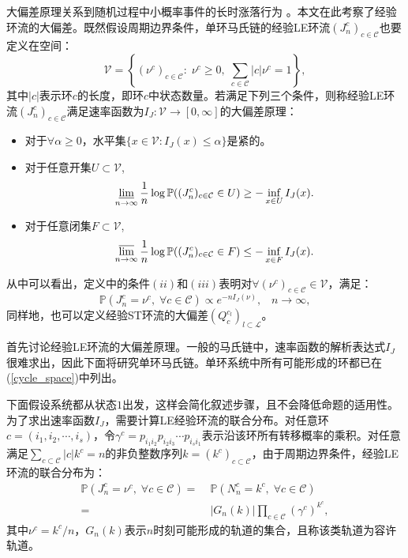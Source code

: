 大偏差原理关系到随机过程中小概率事件的长时涨落行为 \cite{varadhan1984large,den2000large}。本文在此考察了经验环流的大偏差。既然假设周期边界条件，单环马氏链的经验LE环流$(J_n^c)_{c \in \mathcal{C}}$也要定义在空间：
\begin{equation*}
    \mathcal{V} = \left\{(\nu^c)_{c\in \mathcal{C}}:\;\nu^c\geq 0,\;
    \sum_{c\in \mathcal{C}}|c|\nu^c  = 1\right\},
\end{equation*}
其中$|c|$表示环$c$的长度，即环$c$中状态数量。若满足下列三个条件\cite{varadhan1984large}，则称经验LE环流$(J_n^c)_{c \in \mathcal{C}}$满足速率函数为$I_J:\mathcal{V}\rightarrow [0,\infty]$的大偏差原理：
\begin{itemize}
    \item 对于$\forall \alpha \geqslant 0$，水平集$\{x \in \mathcal{V}: I_{J}(x) \leqslant \alpha\}$是紧的。
    \item 对于任意开集$U \subset \mathcal{V}$,
        \begin{equation}\label{def1}
            \varliminf_{n\to\infty}\frac{1}{n}\log\mathbb{P}((J^c_n)_{c\in\mathcal{C}}\in U)\ge-\inf_{x\in U}I_J(x).
        \end{equation}
    \item 对于任意闭集$F \subset \mathcal{V}$,
        \begin{equation}\label{def2}
            \varlimsup_{n\to \infty}\frac{1}{n}\log\mathbb{P}((J^c_n)_{c\in\mathcal{C}}\in F)\le -\inf_{x\in F}I_J(x).
        \end{equation}
\end{itemize}
从中可以看出，定义中的条件$(ii)$和$(iii)$表明对$\forall (\nu^c)_{c\in\mathcal{C}}\in\mathcal{V}$，满足：
\begin{equation}\label{LDP}
    \mathbb{P}(J^c_n=\nu^c,\;\forall c\in\mathcal{C})\propto e^{-n I_J(\nu)},\;\;\;n\to\infty,
\end{equation}
同样地，也可以定义经验ST环流的大偏差$(Q_c^{c_l})_{l \subset \mathcal{L}}$。

首先讨论经验LE环流的大偏差原理。一般的马氏链中，速率函数的解析表达式$I_J$很难求出，因此下面将研究单环马氏链。单环系统中所有可能形成的环都已在 (\ref{cycle_space})中列出。

下面假设系统都从状态$1$出发，这样会简化叙述步骤，且不会降低命题的适用性。为了求出速率函数$I_J$，需要计算LE经验环流的联合分布。对任意环$c=(i_1, i_2, \cdots, i_s)$，令$\gamma^c = p_{i_1i_2}p_{i_2i_3}\cdots p_{i_si_1}$表示沿该环所有转移概率的乘积。对任意满足$\sum_{c \subset \mathcal{C}} |c| k^c=n$的非负整数序列$k=(k^c)_{c\subset \mathcal{C}}$，由于周期边界条件，经验LE环流的联合分布为：
\begin{equation}\label{joint}
    \begin{split}
    \mathbb{P}\left(J^c_n=\nu^c,\;\forall c\in\mathcal{C}\right)
    =&\;\mathbb{P}\left(N^c_n=k^c,\;\forall c\in\mathcal{C}\right)\\
    =&\;|G_n(k)|\prod_{c\in\mathcal{C}}\left(\gamma^c\right)^{k^c},
    \end{split}
\end{equation}
其中$\nu^c = k^c/n$，$G_n(k)$表示$n$时刻可能形成的轨道的集合，且称该类轨道为容许轨道。

